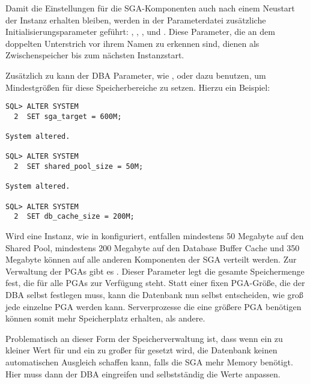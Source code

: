         Damit die Einstellungen für die SGA-Komponenten auch nach einem Neustart der Instanz erhalten bleiben, werden in der Parameterdatei zusätzliche Initialisierungsparameter geführt: , , ,  und . Diese Parameter, die an dem doppelten Unterstrich vor ihrem Namen zu erkennen sind, dienen als Zwischenspeicher bis zum nächsten Instanzstart.

        Zusätzlich zu  kann der DBA Parameter, wie ,  oder  dazu benutzen, um Mindestgrößen für diese Speicherbereiche zu setzen. Hierzu ein Beispiel:
        \begin{lstlisting}[caption={Ein Rechenbeispiel},label=admin23,language=oracle_sql]
SQL> ALTER SYSTEM
  2  SET sga_target = 600M;

System altered.

SQL> ALTER SYSTEM
  2  SET shared_pool_size = 50M;

System altered.

SQL> ALTER SYSTEM
  2  SET db_cache_size = 200M;
        \end{lstlisting}
        Wird eine Instanz, wie in  konfiguriert, entfallen mindestens 50 Megabyte auf den Shared Pool, mindestens 200 Megabyte auf den Database Buffer Cache und 350 Megabyte können auf alle anderen Komponenten der SGA verteilt werden.
\clearpage
        Zur Verwaltung der PGAs gibt es . Dieser Parameter legt die gesamte Speichermenge fest, die für alle PGAs zur Verfügung steht. Statt einer fixen PGA-Größe, die der DBA selbst festlegen muss, kann die Datenbank nun selbst entscheiden, wie groß jede einzelne PGA werden kann. Serverprozesse die eine größere PGA benötigen können somit mehr Speicherplatz erhalten, als andere.

        Problematisch an dieser Form der Speicherverwaltung ist, dass wenn ein zu kleiner Wert für  und ein zu großer für  gesetzt wird, die Datenbank keinen automatischen Ausgleich schaffen kann, falls die SGA mehr Memory benötigt. Hier muss dann der DBA eingreifen und selbstständig die Werte anpassen.

